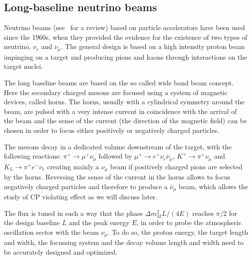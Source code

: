 \subsection{Long-baseline neutrino beams }

Neutrino beams (see~\cite{Kopp2007101} for a review) based on particle accelerators have been used since the 1960s, when they provided the evidence for the existence of two types of neutrino, $\nu_e$ and $\nu_\mu$. The general design is based on a high intensity proton beam impinging on a target and producing pions and kaons through interactions on the target nuclei. 

The long baseline beams are based on the so called wide band beam concept. Here the secondary charged mesons are focused using a system of magnetic devices, called horns. The horns, usually with a cylindrical symmetry around the beam, are pulsed with a very intense current in coincidence with the arrival of the beam and the sense of the current (the direction of the magnetic field) can be chosen in order to focus either positively or negatively charged particles. 
 
The mesons decay in a dedicated volume downstream of the target, with the following reactions: 
$\pi^+ \rightarrow \mu^+ \nu_\mu$ followed by 
$\mu^+ \rightarrow e^+ \nu_e \bar{\nu}_\mu $,
$K^+ \rightarrow \pi^+ \nu_\mu$ and $K_L \rightarrow \pi^+ e^- \nu_e$
creating mainly a $\nu_\mu$ beam if positively charged pions are selected by the horns. Reversing the sense of the current in the horns allows to focus negatively charged particles and therefore to produce a $\bar{\nu}_\mu$ beam, which allows the study of CP  violating effect as we will discuss later. 
 
The flux is tuned in such a way that the phase $\Delta m^2_{32} L/ (4 E)$ reaches $\pi/2$ for the design baseline $L$ and the peak energy $E$, in order to probe the atmospheric oscillation sector with the beam $\nu_\mu$. To do so, the proton energy, the target length and width, the focussing system and the decay volume length and width need to be accurately designed and optimized.   

